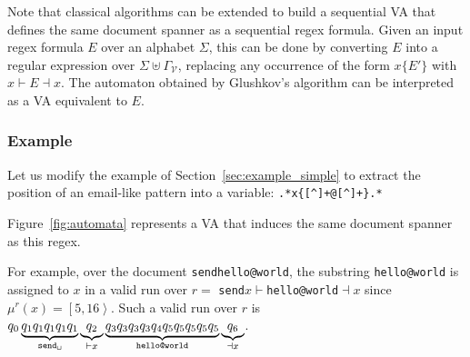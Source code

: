 \documentclass[11px]{article}
\theoremstyle{definition}
\newcommand{\Span}[1]{\left[ #1 \right\rangle}
\newcommand{\pierre}[1]{\textcolor{magenta}{[\textbf{Pierre:} #1]}}
\begin{document}

        Note that classical algorithms can be extended to build a sequential VA
        that defines the same document spanner as a sequential regex formula.
        Given an input regex formula $E$ over an alphabet $\Sigma$, this can be
        done by converting $E$ into a regular expression over $\Sigma \uplus
        \Gamma_\mathcal{V}$, replacing any occurrence of the form $x\{E'\}$
        with $x{\vdash} E {\dashv}x$. The automaton obtained by Glushkov's
        algorithm can be interpreted as a VA equivalent to $E$.

      \subsubsection{Example}

        Let us modify the example of Section~\ref{sec:example_simple} to
        extract the position of an email-like pattern into a variable:
        \texttt{.*x\{[\textasciicircum\textvisiblespace]+@[\textasciicircum\textvisiblespace]+\}.*}


        Figure~\ref{fig:automata} represents a VA that induces the same
        document spanner as this regex.

        For example, over the document
        \texttt{send{\textvisiblespace}hello@world}, the substring
        \texttt{hello@world} is assigned to $x$ in a valid run over $r =$
        \texttt{send{\textvisiblespace}$x{\vdash}$hello@world${\dashv}x$} since
        $\mu^r(x) = \Span{5, 16}$. Such a valid run over $r$ is $q_0
        \underbrace{q_1 q_1 q_1 q_1 q_1}_\texttt{send\textvisiblespace}
        \underbrace{q_2}_{{\vdash}x} \underbrace{q_3 q_3 q_3 q_3 q_4 q_5 q_5
        q_5 q_5 q_5}_\texttt{hello@world} \underbrace{q_6}_{{\dashv}x}$.
\end{document}
